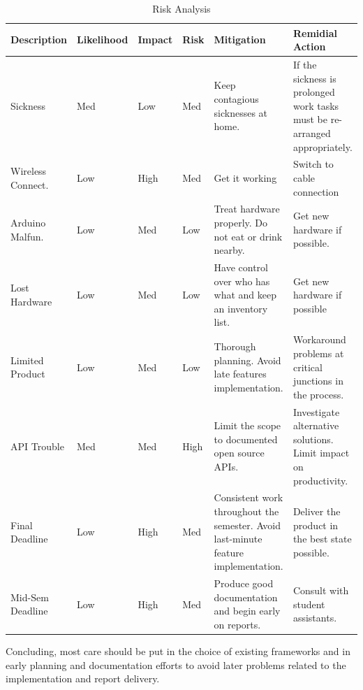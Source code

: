 \begin{table}
	\begin{center}
		\begin{tabular}{| l | l | l | l | p{2.8cm} | p{2.8cm} |}
\hline

Description & Likelihood & Impact & Risk & Mitigation & Remidial Action\\ \hline

Sickness 			& Med & Low & Med & Keep contagious sicknesses at home.
					& If the sickness is prolonged work tasks must be re-arranged appropriately. \\

Wireless Connect. & Low & High & Med & Get it working & Switch to cable connection \\

Arduino Malfun. & Low & Med & Low & Treat hardware properly. Do not eat or drink nearby.
					&  Get new hardware if possible.\\

Lost Hardware & Low & Med & Low & Have control over who has what and keep an inventory list.
					& Get new hardware if possible \\

Limited Product & Low & Med & Low & Thorough planning. Avoid late features implementation.
					&  Workaround problems at critical junctions in the process.\\

API Trouble & Med & Med & High & Limit the scope to documented open source APIs.
			& Investigate alternative solutions. Limit impact on productivity. \\

Final Deadline & Low & High & Med & Consistent work throughout the semester. Avoid last-minute feature implementation.
			&  Deliver the product in the best state possible.\\
Mid-Sem Deadline & Low & High & Med & Produce good documentation and begin early on reports.
			&  Consult with student assistants.\\
		\hline
		\end{tabular}
	\end{center}
	\caption{Risk Analysis}
	\label{table:riskanalysis}
\end{table}

Concluding, most care should be put in the choice of existing frameworks and in early planning
and documentation efforts to avoid later problems related to the implementation and report delivery.

